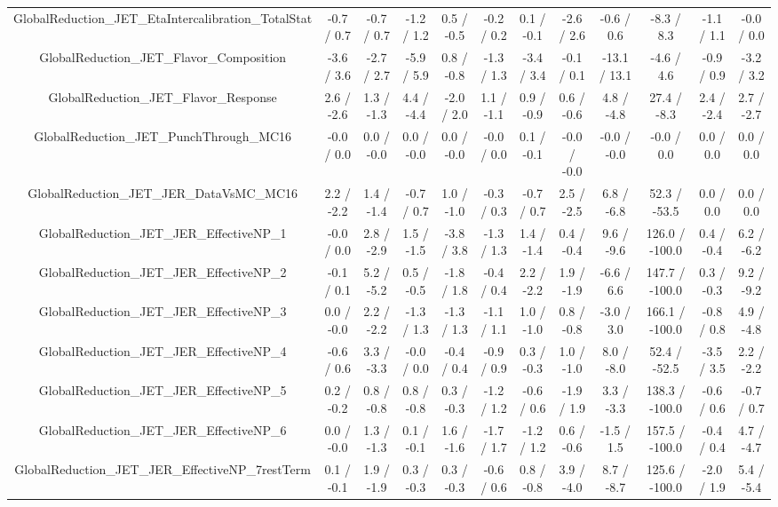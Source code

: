 \begin{table}[htbp]
\begin{center}
\begin{tabular}{|c|c|c|c|c|c|c|c|c|c|c|c|}
  GlobalReduction_JET_EtaIntercalibration_TotalStat & -0.7 / 0.7 & -0.7 / 0.7 & -1.2 / 1.2 & 0.5 / -0.5 & -0.2 / 0.2 & 0.1 / -0.1 & -2.6 / 2.6 & -0.6 / 0.6 & -8.3 / 8.3 & -1.1 / 1.1 & -0.0 / 0.0 \\ 
  GlobalReduction_JET_Flavor_Composition & -3.6 / 3.6 & -2.7 / 2.7 & -5.9 / 5.9 & 0.8 / -0.8 & -1.3 / 1.3 & -3.4 / 3.4 & -0.1 / 0.1 & -13.1 / 13.1 & -4.6 / 4.6 & -0.9 / 0.9 & -3.2 / 3.2 \\ 
  GlobalReduction_JET_Flavor_Response & 2.6 / -2.6 & 1.3 / -1.3 & 4.4 / -4.4 & -2.0 / 2.0 & 1.1 / -1.1 & 0.9 / -0.9 & 0.6 / -0.6 & 4.8 / -4.8 & 27.4 / -8.3 & 2.4 / -2.4 & 2.7 / -2.7 \\ 
  GlobalReduction_JET_PunchThrough_MC16 & -0.0 / 0.0 & 0.0 / -0.0 & 0.0 / -0.0 & 0.0 / -0.0 & -0.0 / 0.0 & 0.1 / -0.1 & -0.0 / -0.0 & -0.0 / -0.0 & -0.0 / 0.0 & 0.0 / 0.0 & 0.0 / 0.0 \\ 
  GlobalReduction_JET_JER_DataVsMC_MC16 & 2.2 / -2.2 & 1.4 / -1.4 & -0.7 / 0.7 & 1.0 / -1.0 & -0.3 / 0.3 & -0.7 / 0.7 & 2.5 / -2.5 & 6.8 / -6.8 & 52.3 / -53.5 & 0.0 / 0.0 & 0.0 / 0.0 \\ 
  GlobalReduction_JET_JER_EffectiveNP_1 & -0.0 / 0.0 & 2.8 / -2.9 & 1.5 / -1.5 & -3.8 / 3.8 & -1.3 / 1.3 & 1.4 / -1.4 & 0.4 / -0.4 & 9.6 / -9.6 & 126.0 / -100.0 & 0.4 / -0.4 & 6.2 / -6.2 \\ 
  GlobalReduction_JET_JER_EffectiveNP_2 & -0.1 / 0.1 & 5.2 / -5.2 & 0.5 / -0.5 & -1.8 / 1.8 & -0.4 / 0.4 & 2.2 / -2.2 & 1.9 / -1.9 & -6.6 / 6.6 & 147.7 / -100.0 & 0.3 / -0.3 & 9.2 / -9.2 \\ 
  GlobalReduction_JET_JER_EffectiveNP_3 & 0.0 / -0.0 & 2.2 / -2.2 & -1.3 / 1.3 & -1.3 / 1.3 & -1.1 / 1.1 & 1.0 / -1.0 & 0.8 / -0.8 & -3.0 / 3.0 & 166.1 / -100.0 & -0.8 / 0.8 & 4.9 / -4.8 \\ 
  GlobalReduction_JET_JER_EffectiveNP_4 & -0.6 / 0.6 & 3.3 / -3.3 & -0.0 / 0.0 & -0.4 / 0.4 & -0.9 / 0.9 & 0.3 / -0.3 & 1.0 / -1.0 & 8.0 / -8.0 & 52.4 / -52.5 & -3.5 / 3.5 & 2.2 / -2.2 \\ 
  GlobalReduction_JET_JER_EffectiveNP_5 & 0.2 / -0.2 & 0.8 / -0.8 & 0.8 / -0.8 & 0.3 / -0.3 & -1.2 / 1.2 & -0.6 / 0.6 & -1.9 / 1.9 & 3.3 / -3.3 & 138.3 / -100.0 & -0.6 / 0.6 & -0.7 / 0.7 \\ 
  GlobalReduction_JET_JER_EffectiveNP_6 & 0.0 / -0.0 & 1.3 / -1.3 & 0.1 / -0.1 & 1.6 / -1.6 & -1.7 / 1.7 & -1.2 / 1.2 & 0.6 / -0.6 & -1.5 / 1.5 & 157.5 / -100.0 & -0.4 / 0.4 & 4.7 / -4.7 \\ 
  GlobalReduction_JET_JER_EffectiveNP_7restTerm & 0.1 / -0.1 & 1.9 / -1.9 & 0.3 / -0.3 & 0.3 / -0.3 & -0.6 / 0.6 & 0.8 / -0.8 & 3.9 / -4.0 & 8.7 / -8.7 & 125.6 / -100.0 & -2.0 / 1.9 & 5.4 / -5.4 \\ 

\end{tabular}
\end{center}
\end{table}
